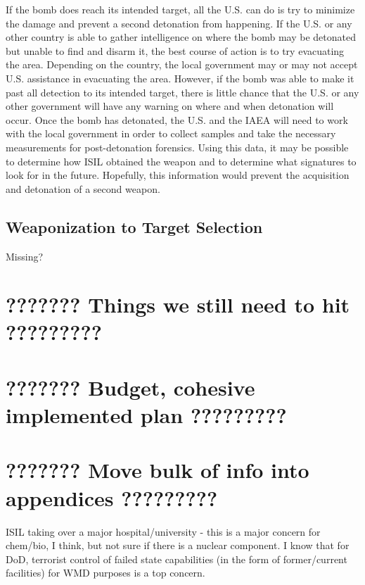 \documentclass{report}
\begin{document}
If the bomb does reach its intended target, all the U.S. can do is try to minimize the damage and prevent a second detonation from happening.  If the U.S. or any other country is able to gather intelligence on where the bomb may be detonated but unable to find and disarm it, the best course of action is to try evacuating the area.  Depending on the country, the local government may or may not accept U.S. assistance in evacuating the area.  However, if the bomb was able to make it past all detection to its intended target, there is little chance that the U.S. or any other government will have any warning on where and when detonation will occur.  Once the bomb has detonated, the U.S. and the IAEA will need to work with the local government in order to collect samples and take the necessary measurements for post-detonation forensics.  Using this data, it may be possible to determine how ISIL obtained the weapon and to determine what signatures to look for in the future.  Hopefully, this information would prevent the acquisition and detonation of a second weapon.



\section{Weaponization to Target Selection}


Missing?




\chapter{???????   Things we still need to hit   ?????????}

\chapter{???????   Budget, cohesive implemented plan   ?????????}

\chapter{???????   Move bulk of info into appendices    ?????????}


ISIL taking over a major hospital/university - this is a major concern for chem/bio, I think, but not sure if there is a nuclear component. I know that for DoD, terrorist control of failed state capabilities (in the form of former/current facilities) for WMD purposes is a top concern.
\end{document}
